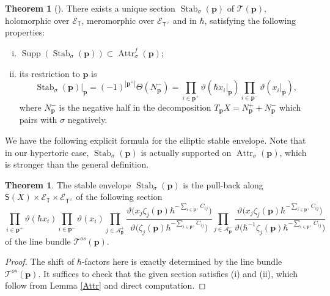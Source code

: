\documentclass[10pt]{amsart}
\theoremstyle{definition}
\def\TT{\mathbb{T}}
\newcommand{\bp}{\mathbf{p}}
\newcommand{\cE}{\mathscr{E}}
\newcommand{\cA}{\mathcal{A}}
\newcommand{\cT}{\mathcal{T}}
\newcommand{\Attr}{\operatorname{Attr}}
\newcommand{\Stab}{\operatorname{Stab}}
\newcommand{\Supp}{\operatorname{Supp}}
\newcommand{\bT}{\mathsf{T}}
\theoremstyle{definition}
\numberwithin{equation}{section}
\theoremstyle{Theorem}
\newtheorem{Theorem}[Definition]{Theorem}
\begin{document}
\begin{Theorem}[\cite{AOelliptic}]
There exists a unique section $\Stab_\sigma (\bp)$ of $\cT(\bp)$, holomorphic over $\cE_\TT$, meromorphic over $\cE_{\bT^\vee}$ and in $\hbar$, satisfying the following properties:
\begin{enumerate}[(i)]
\setlength{\parskip}{1ex}

\item $\Supp (\Stab_\sigma (\bp)) \subset \Attr^f_\sigma (\bp)$;

\item its restriction to $\bp$ is
$$
\Stab_\sigma (\bp) |_\bp = (-1)^{|\bp^+|} \Theta (N_\bp^-) = \prod_{i\in \bp^+} \vartheta (\hbar x_i |_\bp) \prod_{i\in \bp^-} \vartheta (x_i |_\bp) ,
$$
where $N_\bp^-$ is the negative half in the decomposition $T_\bp X = N_\bp^+ + N_\bp^-$ which pairs with $\sigma$ negatively.

\end{enumerate}
\end{Theorem}

We have the following explicit formula for the elliptic stable envelope. Note that in our hypertoric case, $\Stab_\sigma(\bp)$ is actually supported on $\overline{\Attr_\sigma (\bp)}$, which is stronger than the general definition. 

\begin{Theorem} \label{Stab-formula}
The stable envelope $\Stab_\sigma (\bp)$ is the pull-back along $\mathsf{S}(X) \times \cE_\TT \times \cE_{\bT^\vee}$ of the following section
$$
\prod_{i \in \bp^+} \vartheta ( \hbar x_i ) \prod_{i \in \bp^-} \vartheta (x_i ) \prod_{j \in \cA_\bp^+} \dfrac{\vartheta \Big( x_j \zeta_j (\bp) \hbar^{- \sum_{i \in \bp^+} C_{ij}} \Big) }{\vartheta \Big( \zeta_j (\bp) \hbar^{- \sum_{i \in \bp^+} C_{ij}}  \Big) } \prod_{j \in \cA_\bp^-} \dfrac{\vartheta \Big( x_j \zeta_j (\bp) \hbar^{- \sum_{i \in \bp^+} C_{ij}} \Big) }{\vartheta \Big( \hbar^{-1} \zeta_j (\bp) \hbar^{- \sum_{i \in \bp^+} C_{ij} }  \Big) }
$$
of the line bundle $\cT^{os} (\bp)$.
\end{Theorem}

\begin{proof}
The shift of $\hbar$-factors here is exactly determined by the line bundle $\cT^{os} (\bp)$. It suffices to check that the given section satisfies (i) and (ii), which follow from Lemma \ref{Attr} and direct computation.
\end{proof}




\vspace{3ex}
\end{document}
